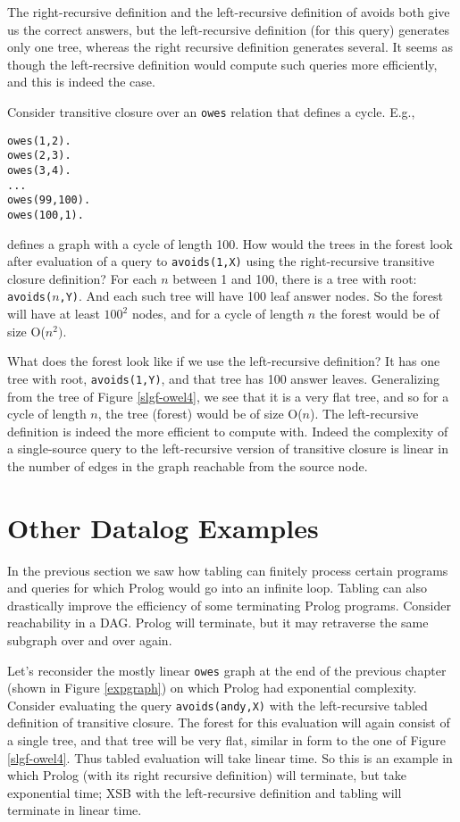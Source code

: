 The right-recursive definition and the left-recursive definition of
avoids both give us the correct answers, but the left-recursive
definition (for this query) generates only one tree, whereas the right
recursive definition generates several.  It seems as though the
left-recrsive definition would compute such queries more efficiently,
and this is indeed the case.

Consider transitive closure over an \verb|owes| relation that defines
a cycle.  E.g.,
\begin{verbatim}
owes(1,2).
owes(2,3).
owes(3,4).
...
owes(99,100).
owes(100,1).
\end{verbatim}
defines a graph with a cycle of length 100.  How would the trees in
the forest look after evaluation of a query to \verb|avoids(1,X)|
using the right-recursive transitive closure definition?  For each $n$
between 1 and 100, there is a tree with root:
\verb|avoids(|$n$\verb|,Y)|.  And each such tree will have 100 leaf
answer nodes.  So the forest will have at least $100^2$ nodes, and for
a cycle of length $n$ the forest would be of size O($n^2)$.

What does the forest look like if we use the left-recursive
definition?  It has one tree with root, \verb|avoids(1,Y)|, and that
tree has 100 answer leaves.  Generalizing from the tree of Figure
\ref{slgf-owel4}, we see that it is a very flat tree, and so for a
cycle of length $n$, the tree (forest) would be of size O($n$).  The
left-recursive definition is indeed the more efficient to compute
with.  Indeed the complexity of a single-source query to the
left-recursive version of transitive closure is linear in the number
of edges in the graph reachable from the source node.

\section{Other Datalog Examples}

In the previous section we saw how tabling can finitely process
certain programs and queries for which Prolog would go into an
infinite loop.  Tabling can also drastically improve the efficiency of
some terminating Prolog programs.  Consider reachability in a DAG.
Prolog will terminate, but it may retraverse the same subgraph over
and over again.

Let's reconsider the mostly linear \verb|owes| graph at the end of the
previous chapter (shown in Figure \ref{expgraph}) on which Prolog had
exponential complexity.  Consider evaluating the query
\verb|avoids(andy,X)| with the left-recursive tabled definition of 
transitive closure.  The forest for this evaluation will again consist
of a single tree, and that tree will be very flat, similar in form to
the one of Figure \ref{slgf-owel4}.  Thus tabled evaluation will take
linear time.  So this is an example in which Prolog (with its right
recursive definition) will terminate, but take exponential time; XSB
with the left-recursive definition and tabling will terminate in
linear time.

